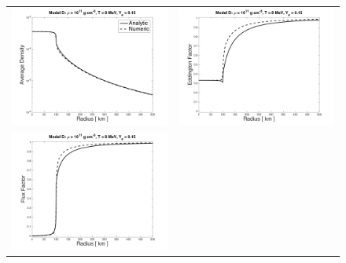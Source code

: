 \documentclass[10pt,preprint]{aastex}
\begin{document}
\begin{figure}
  \begin{center}
    \begin{tabular}{cc}
      \includegraphics[scale=0.4]{./Figures/HomogeneousSphereTable_D_Density} &
      \includegraphics[scale=0.4]{./Figures/HomogeneousSphereTable_D_EddingtonFactor} \\
      \includegraphics[scale=0.4]{./Figures/HomogeneousSphereTable_D_FluxFactor} &

\end{tabular}
\end{center}
\end{figure}
\end{document}
